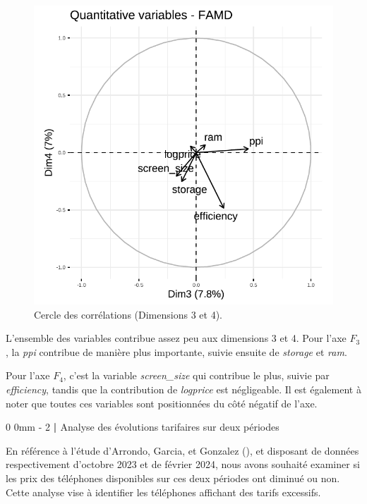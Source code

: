 \documentclass[
  12pt,
]{report}
\makeatletter
\renewcommand{\chapter}{%
    \clearpage %
    \@startsection{chapter}%
    {0} %
    {0mm} %
    {-\baselineskip} %
    {2\baselineskip} %
    {\normalfont\Huge\bfseries | \Huge\bfseries}%
}
\makeatother
\begin{document}
\begin{figure}[H]

{\centering \includegraphics{report_files/figure-pdf/unnamed-chunk-18-1.pdf}

}

\caption{Cercle des corrélations (Dimensions 3 et 4).}

\end{figure}%

L'ensemble des variables contribue assez peu aux dimensions 3 et 4. Pour
l'axe \(F_3\), la \emph{ppi} contribue de manière plus importante,
suivie ensuite de \emph{storage} et \emph{ram}.

Pour l'axe \(F_4\), c'est la variable \emph{screen\_size} qui contribue
le plus, suivie par \emph{efficiency}, tandis que la contribution de
\emph{logprice} est négligeable. Il est également à noter que toutes ces
variables sont positionnées du côté négatif de l'axe.

\chapter{Analyse des évolutions tarifaires sur deux
périodes}\label{analyse-des-uxe9volutions-tarifaires-sur-deux-puxe9riodes}

En référence à l'étude d'Arrondo, Garcia, et Gonzalez
(), et disposant de données
respectivement d'octobre 2023 et de février 2024, nous avons souhaité
examiner si les prix des téléphones disponibles sur ces deux périodes
ont diminué ou non. Cette analyse vise à identifier les téléphones
affichant des tarifs excessifs.
\end{document}
